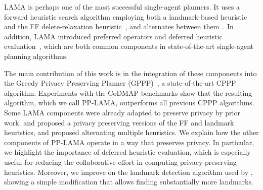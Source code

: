 \documentclass[letterpaper]{article}
\theoremstyle{definition}
\begin{document}
LAMA is perhaps one of the most successful single-agent planners.
It uses a forward heuristic search algorithm employing both a landmark-based heuristic~\citep{richter2008landmarks} and the FF delete-relaxation heuristic~\citep{hoffmann2001ff}, and alternates between them~\citep{roger2010theMore}. In addition, LAMA introduced preferred operators and deferred heuristic evaluation~\citep{richter2009preferred}, which are both common components in state-of-the-art single-agent planning algorithms.

The main contribution of this work is in the integration of these components into the Greedy Privacy Preserving Planner (GPPP)~\citep{maliah2014privacyPreserving}, a state-of-the-art CPPP algorithm. Experiments with the CoDMAP benchmarks show that the resulting algorithm, which we call PP-LAMA, outperforms all previous CPPP algorithms.
Some LAMA components were already adapted to preserve privacy by prior work. \cite{vstolba2014relaxation} and \cite{maliah2014privacyPreserving}
proposed a privacy preserving versions of the FF and landmark heuristics, and \cite{torreno2015global} proposed alternating multiple heuristics.
We explain how the other components of PP-LAMA operate in a way that preserves privacy.
In particular, we highlight the importance of deferred heuristic evaluation, which is especially useful for reducing the collaborative effort in computing privacy preserving heuristics. Moreover, we improve on the landmark detection algorithm used by \cite{maliah2014privacyPreserving}, showing a simple modification that allows finding substantially more landmarks. %
\end{document}
